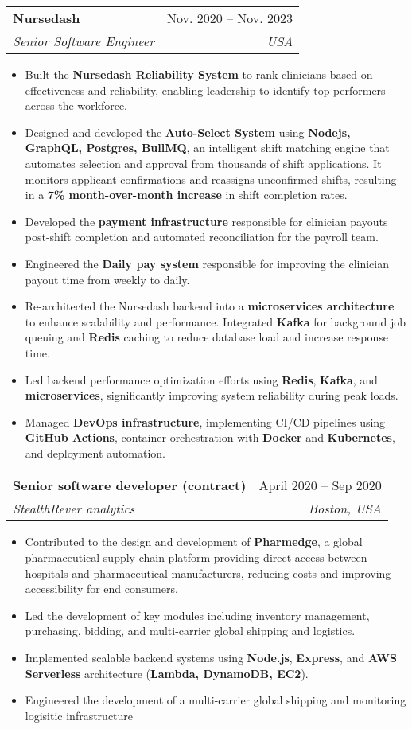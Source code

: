 \documentclass[letterpaper,11pt]{article}
\makeatletter
\newcommand{\resumeItem}[1]{
  \item\small{
    {#1 \vspace{-2pt}}
  }
}
\newcommand{\resumeSubheading}[4]{
  \vspace{-2pt}\item
    \begin{tabular*}{0.97\textwidth}[t]{l@{\extracolsep{\fill}}r}
      \textbf{#1} & #2 \\
      \textit{\small#3} & \textit{\small #4} \\
    \end{tabular*}\vspace{-7pt}
}
\newcommand{\resumeSubSubheading}[2]{
    \item
    \begin{tabular*}{0.97\textwidth}{l@{\extracolsep{\fill}}r}
      \textit{\small#1} & \textit{\small #2} \\
    \end{tabular*}\vspace{-7pt}
}
\newcommand{\resumeSubHeadingListEnd}{\end{itemize}}
\newcommand{\resumeItemListStart}{\begin{itemize}}
\newcommand{\resumeItemListEnd}{\end{itemize}\vspace{-5pt}}
\makeatother
\begin{document}

    \resumeSubheading
      {Nursedash}{Nov. 2020 -- Nov. 2023}
      {Senior Software Engineer}{USA}
      \resumeItemListStart
          \resumeItem{Built the \textbf{Nursedash Reliability System} to rank clinicians based on effectiveness and reliability, enabling leadership to identify top performers across the workforce.}
          \resumeItem{Designed and developed the \textbf{Auto-Select System} using \textbf{Nodejs, GraphQL, Postgres, BullMQ}, an intelligent shift matching engine that automates selection and approval from thousands of shift applications. It monitors applicant confirmations and reassigns unconfirmed shifts, resulting in a \textbf{7\% month-over-month increase} in shift completion rates.}
          \resumeItem{Developed the \textbf{payment infrastructure} responsible for clinician payouts post-shift completion and automated reconciliation for the payroll team.}
          \resumeItem{Engineered the \textbf{Daily pay system} responsible for improving the clinician payout time from weekly to daily.}
          \resumeItem{Re-architected the Nursedash backend into a \textbf{microservices architecture} to enhance scalability and performance. Integrated \textbf{Kafka} for background job queuing and \textbf{Redis} caching to reduce database load and increase response time.}
          \resumeItem{Led backend performance optimization efforts using \textbf{Redis}, \textbf{Kafka}, and \textbf{microservices}, significantly improving system reliability during peak loads.}
          \resumeItem{Managed \textbf{DevOps infrastructure}, implementing CI/CD pipelines using \textbf{GitHub Actions}, container orchestration with \textbf{Docker} and \textbf{Kubernetes}, and deployment automation.}
      
    \resumeItemListEnd

    \resumeSubheading
      {Senior software developer (contract)}{April 2020 -- Sep 2020}
      {StealthRever analytics}{Boston, USA}
      \resumeItemListStart
        \resumeItem{Contributed to the design and development of \textbf{Pharmedge}, a global pharmaceutical supply chain platform providing direct access between hospitals and pharmaceutical manufacturers, reducing costs and improving accessibility for end consumers.}
        \resumeItem{Led the development of key modules including inventory management, purchasing, bidding, and multi-carrier global shipping and logistics.}
        \resumeItem{Implemented scalable backend systems using \textbf{Node.js}, \textbf{Express}, and \textbf{AWS Serverless} architecture (\textbf{Lambda, DynamoDB, EC2}).}
        \resumeItem{Engineered the development of a multi-carrier global shipping and monitoring logisitic infrastructure}
      \resumeItemListEnd
\end{document}
